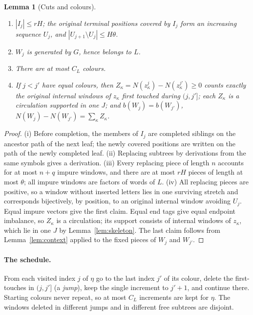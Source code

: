 \documentclass[11pt]{article}
\numberwithin{equation}{section}
\theoremstyle{plain}
\newtheorem{lemma}[theorem]{Lemma}
\theoremstyle{definition}
\theoremstyle{remark}
\theoremstyle{plain}
\begin{document}
\begin{lemma}[Cuts and colours]
\label{lem:colours}
\begin{enumerate}[label=(\roman*),leftmargin=*]
\item $|I_j|\le rH$; the original terminal positions covered by $I_j$ form an
increasing sequence $U_j$, and $|U_{j+1}\setminus U_j|\le H\theta$.
\item $W_j$ is generated by $G$, hence belongs to $L$.
\item There are at most $C_L$ colours.
\item If $j<j'$ have equal colours, then
$Z_\kappa=N(z^j_\kappa)-N(z^{j'}_\kappa)\ge0$ counts exactly the original
internal windows of $z_\kappa$ first touched during $(j,j']$; each $Z_\kappa$ is
a circulation supported in one $J$; and $b(W_j)=b(W_{j'})$,
$N(W_j)-N(W_{j'})=\sum_\kappa Z_\kappa$.
\end{enumerate}
\end{lemma}

\begin{proof}
(i) Before completion, the members of $I_j$ are completed siblings on the
ancestor path of the next leaf; the newly covered positions are written on the
path of the newly completed leaf.  (ii) Replacing subtrees by derivations from
the same symbols gives a derivation.  (iii) Every replacing piece of length $n$
accounts for at most $n+q$ impure windows, and there are at most $rH$ pieces of
length at most $\theta$; all impure windows are factors of words of $L$.
(iv) All replacing pieces are positive, so a window without inserted letters
lies in one surviving stretch and corresponds bijectively, by position, to an
original internal window avoiding $U_j$.  Equal impure vectors give the first
claim.  Equal end tags give equal endpoint imbalance, so $Z_\kappa$ is a
circulation; its support consists of internal windows of $z_\kappa$, which lie in
one $J$ by Lemma~\ref{lem:skeleton}.  The last claim follows from
Lemma~\ref{lem:context} applied to the fixed pieces of $W_j$ and $W_{j'}$.
\end{proof}

\paragraph{The schedule.}
From each visited index $j$ of $\eta$ go to the last index $j'$ of its colour,
delete the first-touches in $(j,j']$ (a \emph{jump}), keep the single increment
to $j'+1$, and continue there.  Starting colours never repeat, so at most $C_L$
increments are kept for $\eta$.  The windows deleted in different jumps and in
different free subtrees are disjoint.
\end{document}
